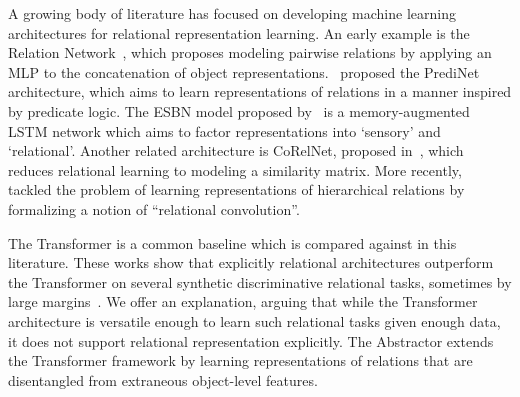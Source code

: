 
% 

A growing body of literature has focused on developing machine learning architectures for relational representation learning. An early example is the Relation Network~\citep{santoro1}, which proposes modeling pairwise relations by applying an MLP to the concatenation of object representations.~\citet{shanahanExplicitlyRelationalNeural} proposed the PrediNet architecture, which aims to learn representations of relations in a manner inspired by predicate logic. The ESBN model proposed by~\citet{esbn} is a memory-augmented LSTM network which aims to factor representations into `sensory' and `relational'. Another related architecture is CoRelNet, proposed in~\citep{kerg2022neural}, which reduces relational learning to modeling a similarity matrix. More recently,~\citet{altabaaRelationalConvolutionalNetworks2023} tackled the problem of learning representations of hierarchical relations by formalizing a notion of ``relational convolution''.

The Transformer is a common baseline which is compared against in this literature. These works show that explicitly relational architectures outperform the Transformer on several synthetic discriminative relational tasks, sometimes by large margins~\citep{shanahanExplicitlyRelationalNeural,esbn,kerg2022neural,altabaaRelationalConvolutionalNetworks2023}. We offer an explanation, arguing that while the Transformer architecture is versatile enough to learn such relational tasks given enough data, it does not support relational representation explicitly. The Abstractor extends the Transformer framework by learning representations of relations that are disentangled from extraneous object-level features.

